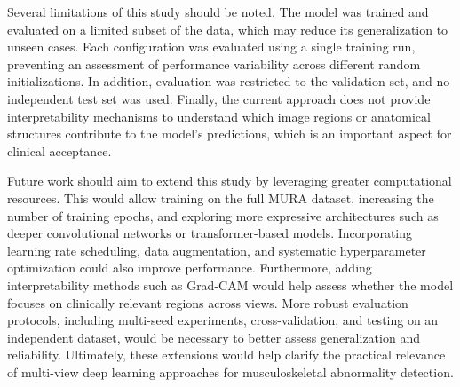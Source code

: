 \documentclass[12pt,a4paper]{article}
\begin{document}
Several limitations of this study should be noted. The model was trained and evaluated on a limited subset of the data, which may reduce its generalization to unseen cases. Each configuration was evaluated using a single training run, preventing an assessment of performance variability across different random initializations. In addition, evaluation was restricted to the validation set, and no independent test set was used. Finally, the current approach does not provide interpretability mechanisms to understand which image regions or anatomical structures contribute to the model’s predictions, which is an important aspect for clinical acceptance.

Future work should aim to extend this study by leveraging greater computational resources. This would allow training on the full MURA dataset, increasing the number of training epochs, and exploring more expressive architectures such as deeper convolutional networks or transformer-based models. Incorporating learning rate scheduling, data augmentation, and systematic hyperparameter optimization could also improve performance. Furthermore, adding interpretability methods such as Grad-CAM would help assess whether the model focuses on clinically relevant regions across views. More robust evaluation protocols, including multi-seed experiments, cross-validation, and testing on an independent dataset, would be necessary to better assess generalization and reliability. Ultimately, these extensions would help clarify the practical relevance of multi-view deep learning approaches for musculoskeletal abnormality detection.

\printbibliography
\end{document}
